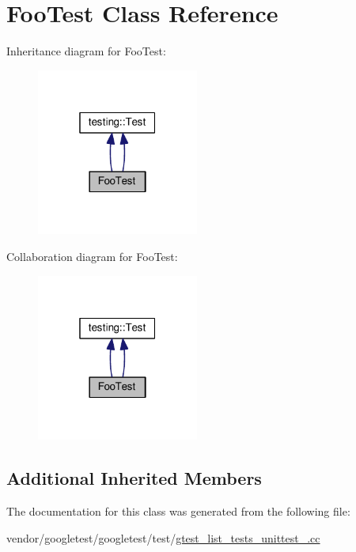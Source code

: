 \hypertarget{classFooTest}{}\section{Foo\+Test Class Reference}
\label{classFooTest}


Inheritance diagram for Foo\+Test\+:
\nopagebreak
\begin{figure}[H]
\begin{center}
\leavevmode
\includegraphics[width=151pt]{classFooTest__inherit__graph}
\end{center}
\end{figure}


Collaboration diagram for Foo\+Test\+:
\nopagebreak
\begin{figure}[H]
\begin{center}
\leavevmode
\includegraphics[width=151pt]{classFooTest__coll__graph}
\end{center}
\end{figure}
\subsection*{Additional Inherited Members}


The documentation for this class was generated from the following file\+:\begin{DoxyCompactItemize}
\item 
vendor/googletest/googletest/test/\hyperlink{gtest__list__tests__unittest___8cc}{gtest\+\_\+list\+\_\+tests\+\_\+unittest\+\_\+.\+cc}\end{DoxyCompactItemize}
